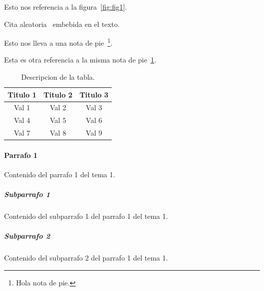\documentclass[a4paper,11pt]{article}                 %
\begin{document}
  Esto nos referencia a la figura~\ref{fig:fig1}.    %
  
  Cita aleatoria~\cite{ref:cita} embebida en el texto.  %
  
  Esto nos lleva a una nota de pie~\footnote{\label{notaDePie}Hola nota de pie.}. %
  
  Esta es otra referencia a la misma nota de pie~\ref{notaDePie}. %
  
  \begin{table}[H]
    \centering                                        %
    \begin{tabular}{ccc}                              %
      \toprule                                        %
      Titulo 1 & Titulo 2 & Titulo 3\\
      \midrule                                        %
      Val 1 & Val 2 & Val 3\\             %
      Val 4 & Val 5 & Val 6\\
      Val 7 & Val 8 & Val 9\\
      \bottomrule                                     %
    \end{tabular}
    \caption{Descripcion de la tabla.}                %
    \label{tab:tab1}                                  %
  \end{table}
  
  \paragraph{Parrafo 1}                               %
  Contenido del parrafo 1 del tema 1.
  
  \subparagraph{Subparrafo 1}                         %
  Contenido del subparrafo 1 del parrafo 1 del tema 1.
  
  \subparagraph{Subparrafo 2}                         %
  Contenido del subparrafo 2 del parrafo 1 del tema 1.
\end{document}
